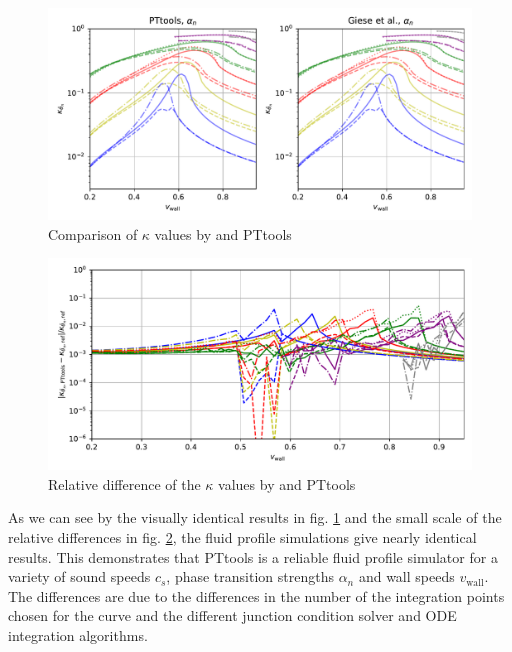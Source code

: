 \begin{figure}[ht!]
\centering
\includegraphics[width=\textwidth]{fig/giese_lisa_fig2_alpha_n.pdf}
\caption{Comparison of $\kappa$ values by \cite[fig. 2]{giese_2021} and PTtools}
\label{fig:kappa_giese}
\end{figure}

\begin{figure}[ht!]
\centering
\includegraphics[width=\textwidth]{fig/giese_lisa_fig2_alpha_n_diff.pdf}
\caption{Relative difference of the $\kappa$ values by \cite[fig. 2]{giese_2021} and PTtools}
\label{fig:kappa_giese_diff}
\end{figure}

As we can see by the visually identical results in fig. \ref{fig:kappa_giese}
and the small scale of the relative differences in fig. \ref{fig:kappa_giese_diff},
the fluid profile simulations give nearly identical results.
This demonstrates that PTtools is a reliable fluid profile simulator for a variety of
sound speeds $c_s$, phase transition strengths $\alpha_n$ and wall speeds $v_\text{wall}$.
The differences are due to the differences in the number of the integration points chosen for the curve
and the different junction condition solver and ODE integration algorithms.

